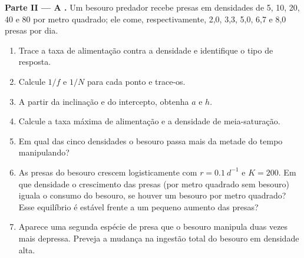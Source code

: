 \begin{problem}
\medskip
\noindent\textbf{Parte II --- A .}
Um besouro predador recebe presas em densidades de 5, 10, 20, 40 e 80
por metro quadrado; ele come, respectivamente, 2,0, 3,3, 5,0, 6,7 e
8,0 presas por dia.
\begin{enumerate}[resume]
  \item Trace a taxa de alimentação contra a densidade e identifique o
        tipo de resposta.
  \item Calcule $1/f$ e $1/N$ para cada ponto e trace-os.
  \item A partir da inclinação e do intercepto, obtenha $a$ e $h$.
  \item Calcule a taxa máxima de alimentação e a densidade de
        meia-saturação.
  \item Em qual das cinco densidades o besouro passa mais da metade do
        tempo manipulando?
  \item As presas do besouro crescem logisticamente com
        $r = \qty{0.1}{d^{-1}}$ e $K = 200$. Em que densidade o
        crescimento das presas (por metro quadrado sem besouro) iguala
        o consumo do besouro, se houver um besouro por metro quadrado?
        Esse equilíbrio é estável frente a um pequeno aumento das
        presas?
  \item Aparece uma segunda espécie de presa que o besouro manipula
        duas vezes mais depressa. Preveja a mudança na ingestão total
        do besouro em densidade alta.
\end{enumerate}


\end{problem}
